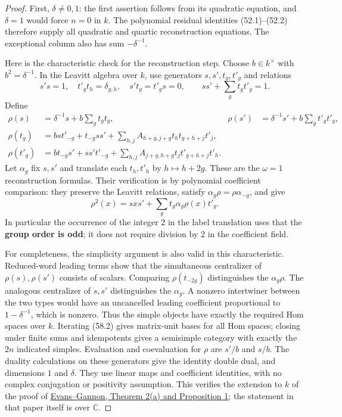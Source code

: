 \documentclass[11pt,reqno]{amsart}
\theoremstyle{plain}
\begin{document}
\begin{proof}
First, \(\delta\ne0,1\): the first assertion follows from
its quadratic equation, and \(\delta=1\) would force \(n=0\) in
\(k\). The polynomial residual identities (52.1)--(52.2) therefore
supply all quadratic and quartic reconstruction equations. The
exceptional column also has sum \(-\delta^{-1}\).

Here is the characteristic check for the reconstruction step. Choose
\(b\in k^\times\) with \(b^2=\delta^{-1}\). In the Leavitt algebra
over \(k\), use generators \(s,s',t_g,t'_g\) and relations
\[
 s's=1,\quad t'_g t_h=\delta_{g,h},\quad s't_g=t'_g s=0,
 \qquad ss'+\sum_g t_g t'_g=1.
\]
Define
\begin{equation*}
\begin{aligned}
 \rho(s)&=\delta^{-1}s+b\sum_g t_g t_g, &
 \rho(s')&=\delta^{-1}s'+b\sum_g t'_g t'_g,\\
 \rho(t_g)&=b s t'_{-g}+t_{-g}ss'
       +\sum_{h,j}A_{h+g,j+g}t_h t_{g+h+j}t'_j,\\
 \rho(t'_g)&=b t_{-g}s'+ss't'_{-g}
       +\sum_{h,j}A_{j+g,h+g}t_j t'_{g+h+j}t'_h.
\end{aligned}
\tag{58.1}
\end{equation*}
Let \(\alpha_g\) fix \(s,s'\) and translate each \(t_h,t'_h\)
by \(h\mapsto h+2g\). These are the \(\omega=1\) reconstruction
formulas. Their verification is by polynomial coefficient comparison:
they preserve the Leavitt relations, satisfy
\(\alpha_g\rho=\rho\alpha_{-g}\), and give
\begin{equation*}
 \rho^2(x)=sxs'+\sum_g t_g\alpha_g\rho(x)t'_g.
 \tag{58.2}
\end{equation*}
In particular the occurrence of the integer 2 in the label translation
uses that the \textbf{group order is odd}; it does not require division by
2 in the coefficient field.

For completeness, the simplicity argument is also valid in this
characteristic. Reduced-word leading terms show that the simultaneous
centralizer of \(\rho(s),\rho(s')\) consists of scalars. Comparing
\(\rho(t_{-2g})\) distinguishes the \(\alpha_g\rho\). The analogous
centralizer of \(s,s'\) distinguishes the \(\alpha_g\). A nonzero
intertwiner between the two types would have an uncancelled leading
coefficient proportional to \(1-\delta^{-1}\), which is nonzero.
Thus the simple objects have exactly the required Hom spaces over
\(k\). Iterating (58.2) gives matrix-unit bases for all Hom spaces;
closing under finite sums and idempotents gives a semisimple category
with exactly the \(2n\) indicated simples. Evaluation and coevaluation
for \(\rho\) are \(s'/b\) and \(s/b\). The duality calculations on
these generators give the identity double dual, and dimensions
\(1\) and \(\delta\). They use linear maps and coefficient identities,
with no complex conjugation or positivity assumption.
This verifies the extension to \(k\) of the proof of
\href{https://arxiv.org/pdf/1506.03546}{Evans--Gannon, Theorem 2(a) and Proposition 1};
the statement in that paper itself is over \(\mathbb C\).


\end{proof}
\end{document}
